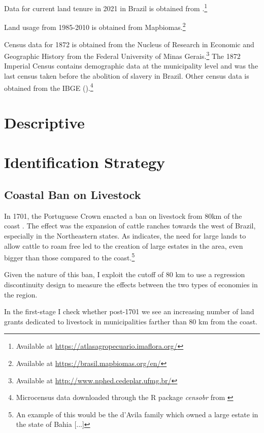 \documentclass{article}
\begin{document}
Data for current land tenure in 2021 in Brazil is obtained from \textcite{Sparovek2019-dn}.\footnote{
  Available at \url{https://atlasagropecuario.imaflora.org/}}

Land usage from 1985-2010 is obtained from Mapbiomas.\textcite{Souza2020-kb}\footnote{
  Available at \url{https://brasil.mapbiomas.org/en/}}

Census data for 1872 is obtained from the Nucleus of Research in Economic and Geographic History from the Federal University of Minas Gerais.\footnote{
  Available at \url{http://www.nphed.cedeplar.ufmg.br/}}
The 1872 Imperial Census contains demographic data at the municipality level and was the last census taken before the abolition of slavery in Brazil. Other census data is obtained from the IBGE (\textit{}).\footnote{Microcensus data downloaded through the R package \textit{censobr} from \textcite{Pereira2023-qv}}

\section{Descriptive}

\section{Identification Strategy}

\subsection{Coastal Ban on Livestock}

In 1701, the Portuguese Crown enacted a ban on livestock from 80km of the coast \parencite[p~.40]{Fausto2014-bh}.
The effect was the expansion of cattle ranches towards the west of Brazil, especially in the Northeastern states. 
As \textcite[p~.41]{Fausto2014-bh} indicates, the need for large lands to allow cattle to roam free led to the creation of large estates in the area, even bigger than those compared to the coast.\footnote{An example of this would be the d'Avila family which owned a large estate in the state of Bahia [...]}

Given the nature of this ban, I exploit the cutoff of 80 km to use a regression discontinuity design to measure the effects between the two types of economies in the region. 

In the first-stage I check whether post-1701 we see an increasing number of land grants dedicated to livestock in municipalities farther than 80 km from the coast. 
\end{document}
